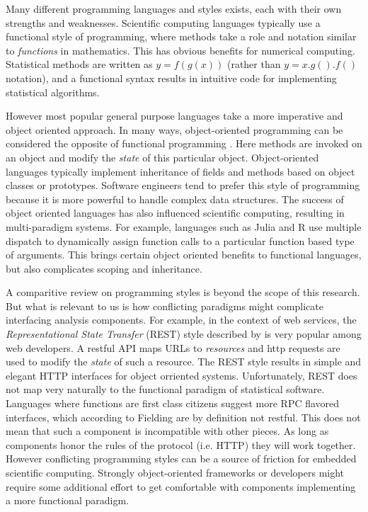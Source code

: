 Many different programming languages and styles exists, each with their own strengths and weaknesses. Scientific computing languages typically use a functional style of programming, where methods take a role and notation similar to \emph{functions} in mathematics. This has obvious benefits for numerical computing. Statistical methods are written as $y = f(g(x))$ (rather than $y = x.g().f()$ notation), and a functional syntax results in intuitive code for implementing statistical algorithms. 

However most popular general purpose languages take a more imperative and object oriented approach. In many ways, object-oriented programming can be considered the opposite of functional programming \citep{pythonfunctional}. Here methods are invoked on an object and modify the \emph{state} of this particular object. Object-oriented languages typically implement inheritance of fields and methods based on object classes or prototypes. Software engineers tend to prefer this style of programming because it is more powerful to handle complex data structures. The success of object oriented languages has also influenced scientific computing, resulting in multi-paradigm systems. For example, languages such as Julia and R use multiple dispatch to dynamically assign function calls to a particular function based type of arguments. This brings certain object oriented benefits to functional languages, but also complicates scoping and inheritance. 

A comparitive review on programming styles is beyond the scope of this research. But what is relevant to us is how conflicting paradigms might complicate interfacing analysis components. For example, in the context of web services, the \emph{Representational State Transfer} (REST) style described by \cite{fielding2000architectural} is very popular among web developers. A restful API maps URLs to \emph{resources} and http requests are used to modify the \emph{state} of such a resource. The REST style results in simple and elegant HTTP interfaces for object orriented systems. Unfortunately, REST does not map very naturally to the functional paradigm of statistical software. Languages where functions are first class citizens suggest more RPC flavored interfaces, which according to Fielding are by definition not restful. This does not mean that such a component is incompatible with other pieces. As long as components honor the rules of the protocol (i.e. HTTP) they will work together. However conflicting programming styles can be a source of friction for embedded scientific computing. Strongly object-oriented frameworks or developers might require some additional effort to get comfortable with components implementing a more functional paradigm.



